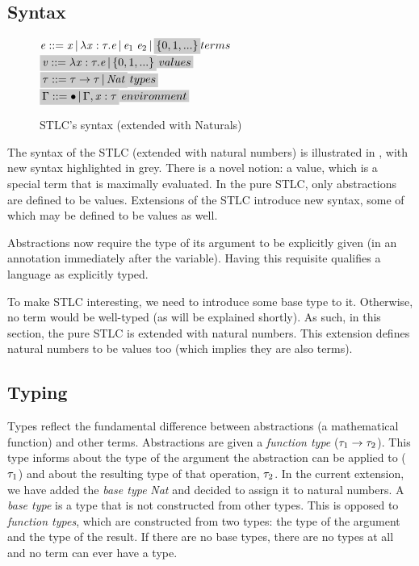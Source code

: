 \subsection{Syntax}
\begin{figure}
  $\term ::= \tmVar\,|\,\lambda \tmVar:\type.\term\,|\,\term_1 \; \term_2 \,|\, \highlight{\{0,1,...\}} \hfill terms $\\
  $\highlight{\tmVal::= \lambda \tmVar:\type.\term \,|\, \{0,1,...\}} \hfill \highlight{values}$\\
  $\highlight{\type ::= \type \rightarrow \type \,|\,\Nat} \hfill \highlight{types}$\\
  $\highlight{\tyEnv::=  \bullet \,|\, \tyEnv, \tmVar:\type} \hfill \highlight{environment}$\\
    \caption{STLC's syntax (extended with Naturals)}
  \label{STLC syntax}
\end{figure}

The syntax of the STLC (extended with natural numbers) is illustrated in , with new syntax highlighted in grey. There is a novel notion: a value, which is a special term that is maximally evaluated. In the pure STLC, only abstractions are defined to be values. Extensions of the STLC introduce new syntax, some of which may be defined to be values as well.

Abstractions now require the type of its argument to be explicitly given (in an annotation immediately after the variable). Having this requisite qualifies a language as explicitly typed.

To make STLC interesting, we need to introduce some base type to it. Otherwise, no term would be well-typed (as will be explained shortly). As such, in this section, the pure STLC is extended with natural numbers. This extension defines natural numbers to be values too (which implies they are also terms).

\subsection{Typing}

Types reflect the fundamental difference between abstractions (a mathematical function) and other terms. Abstractions are given a \textit{function type} ($\mathit{\tau}_1 \rightarrow \mathit{\tau}_2$). This type informs about the type of the argument the abstraction can be applied to ($\mathit{\tau}_1$) and about the resulting type of that operation, $\mathit{\tau}_2$. In the current extension, we have added the \textit{base type} \textit{Nat} and decided to assign it to natural numbers. A \textit{base type} is a type that is not constructed from other types. This is opposed to \textit{function types}, which are constructed from two types: the type of the argument and the type of the result. If there are no base types, there are no types at all and no term can ever have a type.

